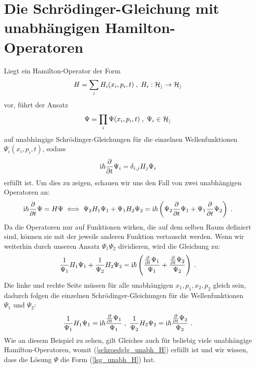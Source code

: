 \section{Die Schrödinger-Gleichung mit unabhängigen Hamilton-Operatoren}
\label{kap:schroedglg_unabh_H}
  Liegt ein Hamilton-Operator der Form
  \begin{equation}
    H = \sum_i H_i(x_i,p_i,t) \;,\; H_i : \cal H_i \rightarrow H_i
    \label{unabh_H}
  \end{equation}
  vor, führt der Ansatz
  \begin{equation}
    \Psi = \prod_i \Psi(x_i,p_i,t) \; , \; \Psi_i \in \cal H_i
    \label{lsg_unabh_H}
  \end{equation}
  auf unabhängige Schrödinger-Gleichungen für die einzelnen Wellenfunktionen \\ $\Psi_i(x_i,p_i,t)$, sodass %
  \begin{equation}
    \text i \hbar \frac{\partial}{\partial t}\Psi_i = \delta_{i,j}  H_j \Psi_i
    \label{schroedglg_unabh_H}
  \end{equation}
  erfüllt ist.
  Um dies zu zeigen, schauen wir uns den Fall von zwei unabhängigen Operatoren an:
  \begin{align}
    \begin{split}
      \text i \hbar \frac{\partial}{\partial t} \Psi = H\Psi \iff \Psi_2 H_1 \Psi_1 + \Psi_1 H_2 \Psi_2 = \text i \hbar \left(\Psi_2\frac{\partial}{\partial t} \Psi_1 + \Psi_1\frac{\partial}{\partial t} \Psi_2 \right) \; .
    \end{split}
  \end{align}
  Da die Operatoren nur auf Funktionen wirken, die auf dem selben Raum definiert sind, können sie mit der jeweils anderen Funktion vertauscht werden.
  Wenn wir weiterhin durch unseren Ansatz $\Psi_1\Psi_2$ dividieren, wird die Gleichung zu:
  \begin{equation}
    \frac{1}{\Psi_1}H_1\Psi_1 + \frac{1}{\Psi_2}H_2\Psi_2 = \text i \hbar \left(\frac{\frac{\partial}{\partial t} \Psi_1}{\Psi_1} + \frac{\frac{\partial}{\partial t} \Psi_2}{\Psi_2} \right) \; .
  \end{equation}
  Die linke und rechte Seite müssen für alle unabhängigen $x_1,p_1,x_2,p_2$ gleich sein, dadurch folgen die einzelnen Schrödinger-Gleichungen für die Wellenfunktionen $\Psi_1$ und $\Psi_2$:
  \begin{equation}
    \frac{1}{\Psi_1}H_1\Psi_1 = \text i\hbar\frac{\frac{\partial}{\partial t} \Psi_1}{\Psi_1} \; , \; \frac{1}{\Psi_2}H_2\Psi_2 =\text i\hbar \frac{\frac{\partial}{\partial t} \Psi_2}{\Psi_2} \; .
  \end{equation}
  Wie an diesem Beispiel zu sehen, gilt Gleiches auch für beliebig viele unabhängige Hamilton-Operatoren, womit (\ref{schroedglg_unabh_H}) erfüllt ist und wir wissen, dass die Lösung $\Psi$ die Form (\ref{lsg_unabh_H}) hat.




